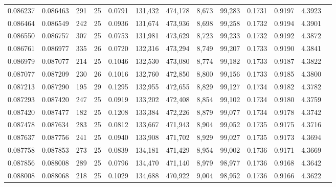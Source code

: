 \begin{tabular}{rrrrrrrrrrrrr}
0.086237 & 0.086463 & 291 &  25 &                                     0.0791 & 131,432 & 474,178 &   8,673 &  99,283 & 0.1731 & 0.9197 & 4.3923 \\
0.086464 & 0.086549 & 242 &  25 &                                     0.0936 & 131,674 & 473,936 &   8,698 &  99,258 & 0.1732 & 0.9194 & 4.3901 \\
0.086550 & 0.086757 & 307 &  25 &                                     0.0753 & 131,981 & 473,629 &   8,723 &  99,233 & 0.1732 & 0.9192 & 4.3872 \\
0.086761 & 0.086977 & 335 &  26 &                                     0.0720 & 132,316 & 473,294 &   8,749 &  99,207 & 0.1733 & 0.9190 & 4.3841 \\
0.086979 & 0.087077 & 214 &  25 &                                     0.1046 & 132,530 & 473,080 &   8,774 &  99,182 & 0.1733 & 0.9187 & 4.3822 \\
0.087077 & 0.087209 & 230 &  26 &                                     0.1016 & 132,760 & 472,850 &   8,800 &  99,156 & 0.1733 & 0.9185 & 4.3800 \\
0.087213 & 0.087290 & 195 &  29 &                                     0.1295 & 132,955 & 472,655 &   8,829 &  99,127 & 0.1734 & 0.9182 & 4.3782 \\
0.087293 & 0.087420 & 247 &  25 &                                     0.0919 & 133,202 & 472,408 &   8,854 &  99,102 & 0.1734 & 0.9180 & 4.3759 \\
0.087420 & 0.087477 & 182 &  25 &                                     0.1208 & 133,384 & 472,226 &   8,879 &  99,077 & 0.1734 & 0.9178 & 4.3742 \\
0.087478 & 0.087634 & 283 &  25 &                                     0.0812 & 133,667 & 471,943 &   8,904 &  99,052 & 0.1735 & 0.9175 & 4.3716 \\
0.087637 & 0.087756 & 241 &  25 &                                     0.0940 & 133,908 & 471,702 &   8,929 &  99,027 & 0.1735 & 0.9173 & 4.3694 \\
0.087758 & 0.087853 & 273 &  25 &                                     0.0839 & 134,181 & 471,429 &   8,954 &  99,002 & 0.1736 & 0.9171 & 4.3669 \\
0.087856 & 0.088008 & 289 &  25 &                                     0.0796 & 134,470 & 471,140 &   8,979 &  98,977 & 0.1736 & 0.9168 & 4.3642 \\
0.088008 & 0.088068 & 218 &  25 &                                     0.1029 & 134,688 & 470,922 &   9,004 &  98,952 & 0.1736 & 0.9166 & 4.3622 \\

\end{tabular}
